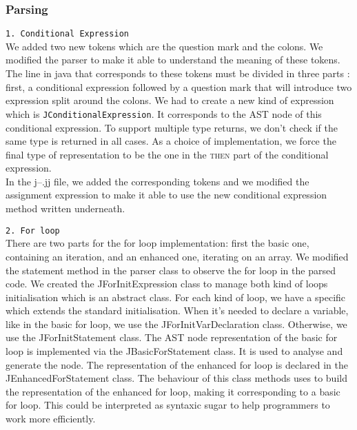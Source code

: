 \subsubsection{Parsing}
\texttt{1. Conditional Expression}\\
We added two new tokens which are the question mark and the colons. We modified the parser to make it able to understand the meaning of these tokens. The line in java that corresponds to these tokens must be divided in three parts : first, a conditional expression followed by a question mark that will introduce two expression split around the colons. We had to create a new kind of expression which is \texttt{JConditionalExpression}. It corresponds to the AST node of this conditional expression. To support multiple type returns, we don't check if the same type is returned in all cases. As a choice of implementation, we force the final type of representation to be the one in the \textsc{then} part of the conditional expression. \\

In the j--.jj file, we added the corresponding tokens and we modified the assignment expression to make it able to use the new conditional expression method written underneath. 

\texttt{2. For loop}\\
There are two parts for the for loop implementation: first the basic one, containing an iteration, and an enhanced one, iterating on an array. We modified the statement method in the parser class to observe the for loop in the parsed code. We created the JForInitExpression class to manage both kind of loops initialisation which is an abstract class. For each kind of loop, we have a specific which extends the standard initialisation. When it's needed to declare a variable, like in the basic for loop, we use the JForInitVarDeclaration class. Otherwise, we use the JForInitStatement class. The AST node representation of the basic for loop is implemented via the JBasicForStatement class. It is used to analyse and generate the node. The representation of the enhanced for loop is declared in the JEnhancedForStatement class. The behaviour of this class methods uses to build the representation of the enhanced for loop, making it corresponding to a basic for loop. This could be interpreted as syntaxic sugar to help programmers to work more efficiently. 